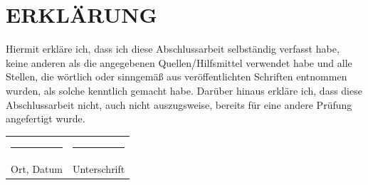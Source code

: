 
\chapter*{ERKLÄRUNG}
Hiermit erkläre ich, dass ich diese Abschlussarbeit selbständig verfasst habe, keine anderen als die angegebenen Quellen/Hilfsmittel verwendet habe und alle Stellen, die wörtlich oder sinngemäß aus veröffentlichten Schriften entnommen wurden, als solche kenntlich gemacht
habe.\newline
Darüber hinaus erkläre ich, dass diese Abschlussarbeit nicht, auch nicht auszugsweise, bereits für eine andere Prüfung angefertigt wurde.
\\[3\normalbaselineskip]
\begin{tabular}{p{} l}
  \rule{\textwidth/3}{0.4pt}   &   \rule{\textwidth/3}{0.4pt} \\
  Ort, Datum                  &   Unterschrift
\end{tabular}

